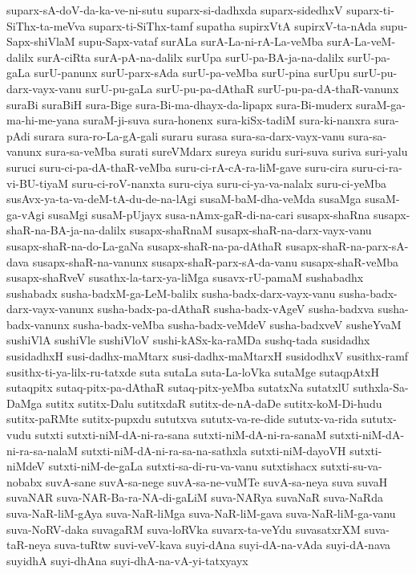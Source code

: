 {suparx-sA-doV-da-ka-ve-ni-sutu
suparx-si-dadhxda
suparx-sidedhxV
suparx-ti-SiThx-ta-meVva
suparx-ti-SiThx-tamf
supatha
supirxVtA
supirxV-ta-nAda
supu-Sapx-shiVlaM
supu-Sapx-vataf
surALa
surA-La-ni-rA-La-veMba
surA-La-veM-dalilx
surA-ciRta
surA-pA-na-dalilx
surUpa
surU-pa-BA-ja-na-dalilx
surU-pa-gaLa
surU-panunx
surU-parx-sAda
surU-pa-veMba
surU-pina
surUpu
surU-pu-darx-vayx-vanu
surU-pu-gaLa
surU-pu-pa-dAthaR
surU-pu-pa-dA-thaR-vanunx
suraBi
suraBiH
sura-Bige
sura-Bi-ma-dhayx-da-lipapx
sura-Bi-muderx
suraM-ga-ma-hi-me-yana
suraM-ji-suva
sura-honenx
sura-kiSx-tadiM
sura-ki-nanxra
sura-pAdi
surara
sura-ro-La-gA-gali
suraru
surasa
sura-sa-darx-vayx-vanu
sura-sa-vanunx
sura-sa-veMba
surati
sureVMdarx
sureya
suridu
suri-suva
suriva
suri-yalu
suruci
suru-ci-pa-dA-thaR-veMba
suru-ci-rA-cA-ra-liM-gave
suru-cira
suru-ci-ra-vi-BU-tiyaM
suru-ci-roV-nanxta
suru-ciya
suru-ci-ya-va-nalalx
suru-ci-yeMba
susAvx-ya-ta-va-deM-tA-du-de-na-lAgi
susaM-baM-dha-veMda
susaMga
susaM-ga-vAgi
susaMgi
susaM-pUjayx
susa-nAmx-gaR-di-na-cari
susapx-shaRna
susapx-shaR-na-BA-ja-na-dalilx
susapx-shaRnaM
susapx-shaR-na-darx-vayx-vanu
susapx-shaR-na-do-La-gaNa
susapx-shaR-na-pa-dAthaR
susapx-shaR-na-parx-sA-dava
susapx-shaR-na-vanunx
susapx-shaR-parx-sA-da-vanu
susapx-shaR-veMba
susapx-shaRveV
susathx-la-tarx-ya-liMga
susavx-rU-pamaM
sushabadhx
sushabadx
susha-badxM-ga-LeM-balilx
susha-badx-darx-vayx-vanu
susha-badx-darx-vayx-vanunx
susha-badx-pa-dAthaR
susha-badx-vAgeV
susha-badxva
susha-badx-vanunx
susha-badx-veMba
susha-badx-veMdeV
susha-badxveV
susheYvaM
sushiVlA
sushiVle
sushiVloV
sushi-kASx-ka-raMDa
sushq-tada
susidadhx
susidadhxH
susi-dadhx-maMtarx
susi-dadhx-maMtarxH
susidodhxV
susithx-ramf
susithx-ti-ya-lilx-ru-tatxde
suta
sutaLa
suta-La-loVka
sutaMge
sutaqpAtxH
sutaqpitx
sutaq-pitx-pa-dAthaR
sutaq-pitx-yeMba
sutatxNa
sutatxlU
suthxla-Sa-DaMga
sutitx
sutitx-Dalu
sutitxdaR
sutitx-de-nA-daDe
sutitx-koM-Di-hudu
sutitx-paRMte
sutitx-pupxdu
sututxva
sututx-va-re-dide
sututx-va-rida
sututx-vudu
sutxti
sutxti-niM-dA-ni-ra-sana
sutxti-niM-dA-ni-ra-sanaM
sutxti-niM-dA-ni-ra-sa-nalaM
sutxti-niM-dA-ni-ra-sa-na-sathxla
sutxti-niM-dayoVH
sutxti-niMdeV
sutxti-niM-de-gaLa
sutxti-sa-di-ru-va-vanu
sutxtishacx
sutxti-su-va-nobabx
suvA-sane
suvA-sa-nege
suvA-sa-ne-vuMTe
suvA-sa-neya
suva
suvaH
suvaNAR
suva-NAR-Ba-ra-NA-di-gaLiM
suva-NARya
suvaNaR
suva-NaRda
suva-NaR-liM-gAya
suva-NaR-liMga
suva-NaR-liM-gava
suva-NaR-liM-ga-vanu
suva-NoRV-daka
suvagaRM
suva-loRVka
suvarx-ta-veYdu
suvasatxrXM
suva-taR-neya
suva-tuRtw
suvi-veV-kava
suyi-dAna
suyi-dA-na-vAda
suyi-dA-nava
suyidhA
suyi-dhAna
suyi-dhA-na-vA-yi-tatxyayx
}
